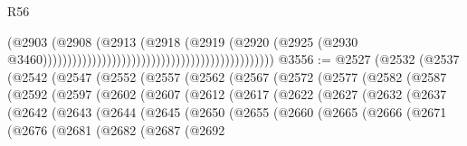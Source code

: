 \begin{lexlean}{R56}
\begin{coremodule}
                                                                                  (@2903
                                                                                    (@2908
                                                                                      (@2913
                                                                                        (@2918
                                                                                          (@2919
                                                                                            (@2920
                                                                                              (@2925
                                                                                                (@2930
                                                                                                  @3460)))))))))))))))))))))))))))))))))))))))))))))))
@3556 := @2527
    (@2532
      (@2537
        (@2542
          (@2547
            (@2552
              (@2557
                (@2562
                  (@2567
                    (@2572
                      (@2577
                        (@2582
                          (@2587
                            (@2592
                              (@2597
                                (@2602
                                  (@2607
                                    (@2612
                                      (@2617
                                        (@2622
                                          (@2627
                                            (@2632
                                              (@2637
                                                (@2642
                                                  (@2643
                                                    (@2644
                                                      (@2645
                                                        (@2650
                                                          (@2655
                                                            (@2660
                                                              (@2665
                                                                (@2666
                                                                  (@2671
                                                                    (@2676
                                                                      (@2681
                                                                        (@2682
                                                                          (@2687
                                                                            (@2692

\end{coremodule}
\end{lexlean}
